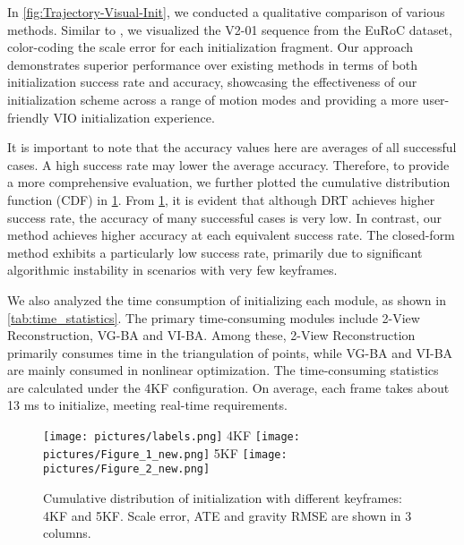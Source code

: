 In \cref{fig:Trajectory-Visual-Init}, we conducted a qualitative comparison of various methods. Similar to \cite{Mono-Depth-VI-Init-2022}, we visualized the V2-01 sequence from the EuRoC dataset, color-coding the scale error for each initialization fragment. Our approach demonstrates superior performance over existing methods in terms of both initialization success rate and accuracy, showcasing the effectiveness of our initialization scheme across a range of motion modes and providing a more user-friendly VIO initialization experience.

It is important to note that the accuracy values here are averages of all successful cases. A high success rate may lower the average accuracy. Therefore, to provide a more comprehensive evaluation, we further plotted the cumulative distribution function (CDF) \cite{Schinazi2022-CDF} in \cref{fig:Init_Error_CDF}. From \cref{fig:Init_Error_CDF}, it is evident that although DRT achieves higher success rate, the accuracy of many successful cases is very low. In contrast, our method achieves higher accuracy at each equivalent success rate. The closed-form method exhibits a particularly low success rate, primarily due to significant algorithmic instability in scenarios with very few keyframes.

We also analyzed the time consumption of initializing each module, as shown in \cref{tab:time_statistics}. The primary time-consuming modules include 2-View Reconstruction, VG-BA and VI-BA. Among these, 2-View Reconstruction primarily consumes time in the triangulation of points, while VG-BA and VI-BA  are mainly consumed in nonlinear optimization. The time-consuming statistics are calculated under the 4KF configuration.  On average, each frame takes about 13 ms to initialize, meeting real-time requirements.

\begin{figure}[!h]
    \centering
    \texttt{[image: pictures/labels.png]}
    4KF
    \centering
    \texttt{[image: pictures/Figure\_1\_new.png]}
    5KF
    \texttt{[image: pictures/Figure\_2\_new.png]}
    \caption{Cumulative distribution of initialization with different keyframes: 4KF and 5KF. Scale error, ATE and gravity RMSE are shown in 3 columns. }
    \label{fig:Init_Error_CDF}
\end{figure}

